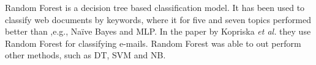 Random Forest is a decision tree based classification model. It has been used to classify web documents by keywords, where it for five and seven topics performed better than ,e.g., Naïve Bayes and MLP. In the paper by Kopriska \emph{et al.} they use Random Forest for classifying e-mails. Random Forest was able to out perform other methods, such as DT, SVM and NB. \cite{keywords}\cite{email}